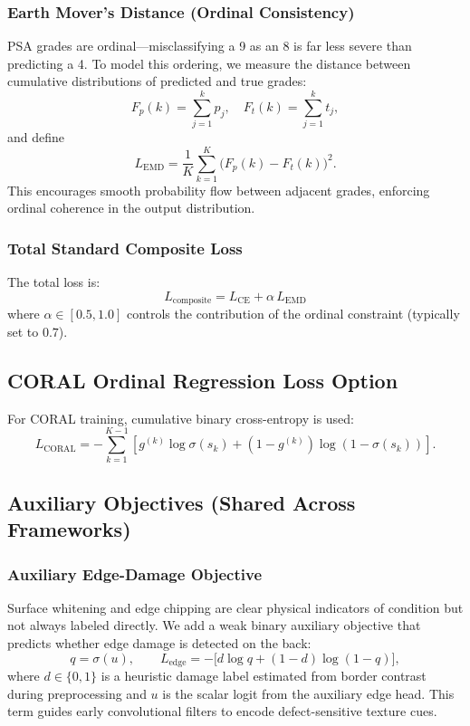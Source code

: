 \documentclass[12pt]{article}
\begin{document}
\subsubsection{Earth Mover's Distance (Ordinal Consistency)}
PSA grades are ordinal---misclassifying a 9 as an 8 is far less severe than predicting a 4. 
To model this ordering, we measure the distance between cumulative distributions of predicted and true grades:
\[
F_p(k)=\sum_{j=1}^{k}p_j, \quad F_t(k)=\sum_{j=1}^{k}t_j,
\]
and define
\[
L_{\text{EMD}} = \frac{1}{K}\sum_{k=1}^{K}\big(F_p(k)-F_t(k)\big)^2.
\]
This encourages smooth probability flow between adjacent grades, enforcing ordinal coherence in the output distribution.

\subsubsection{Total Standard Composite Loss}
The total loss is:
\[
L_{\text{composite}} = L_{\text{CE}} + \alpha\,L_{\text{EMD}}
\]
where $\alpha \in [0.5, 1.0]$ controls the contribution of the ordinal constraint (typically set to $0.7$).

\subsection{CORAL Ordinal Regression Loss Option}
For CORAL training, cumulative binary cross-entropy is used:
\[
L_{\text{CORAL}} = -\sum_{k=1}^{K-1} \left[ g^{(k)} \log \sigma(s_k) + (1 - g^{(k)}) \log (1 - \sigma(s_k)) \right].
\]

\subsection{Auxiliary Objectives (Shared Across Frameworks)}

\subsubsection{Auxiliary Edge-Damage Objective}
Surface whitening and edge chipping are clear physical indicators of condition but not always labeled directly. 
We add a weak binary auxiliary objective that predicts whether edge damage is detected on the back:
\[
q = \sigma(u), \qquad 
L_{\text{edge}} = -\big[d\log q + (1-d)\log(1-q)\big],
\]
where $d \in \{0,1\}$ is a heuristic damage label estimated from border contrast during preprocessing and $u$ is the scalar logit from the auxiliary edge head.
This term guides early convolutional filters to encode defect-sensitive texture cues.
\end{document}
